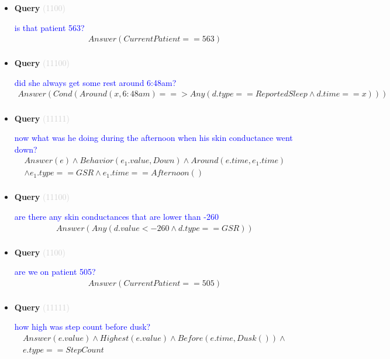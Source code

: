 \documentclass[11pt]{article}
\newcommand{\key}[1]{\textcolor{lightgray}{#1}}
\newcounter{CQuery}
\begin{document}
\begin{itemize}
\item
\textbf{Query\theCQuery} \key{(1100)} \addtocounter{CQuery}{1}
\textcolor{blue}{ is that patient 563? }
\begin{multline*}
Answer(CurrentPatient==563) \\ 
\end{multline*}


\item
\textbf{Query\theCQuery} \key{(11100)} \addtocounter{CQuery}{1}
\textcolor{blue}{ did she always get some rest around 6:48am? }
\begin{multline*}
Answer(Cond(Around(x, 6:48am) ==> Any(d.type==ReportedSleep \wedge d.time==x))) \\ 
\end{multline*}


\item
\textbf{Query\theCQuery} \key{(11111)} \addtocounter{CQuery}{1}
\textcolor{blue}{ now what was he doing during the afternoon when his skin conductance went down? }
\begin{multline*}
Answer(e) \wedge Behavior(e_1.value, Down) \wedge Around(e.time, e_1.time) \\ 
\wedge e_1.type==GSR \wedge e_1.time==Afternoon() \\ 
\end{multline*}


\item
\textbf{Query\theCQuery} \key{(11100)} \addtocounter{CQuery}{1}
\textcolor{blue}{ are there any skin conductances that are lower than -260 }
\begin{multline*}
Answer(Any(d.value<-260 \wedge d.type==GSR)) \\ 
\end{multline*}


\item
\textbf{Query\theCQuery} \key{(1100)} \addtocounter{CQuery}{1}
\textcolor{blue}{ are we on patient 505? }
\begin{multline*}
Answer(CurrentPatient==505) \\ 
\end{multline*}


\item
\textbf{Query\theCQuery} \key{(11111)} \addtocounter{CQuery}{1}
\textcolor{blue}{ how high was step count before dusk? }
\begin{multline*}
Answer(e.value) \wedge Highest(e.value) \wedge Before(e.time, Dusk()) \wedge \\ 
e.type==StepCount \\ 
\end{multline*}



\end{itemize}
\end{document}
